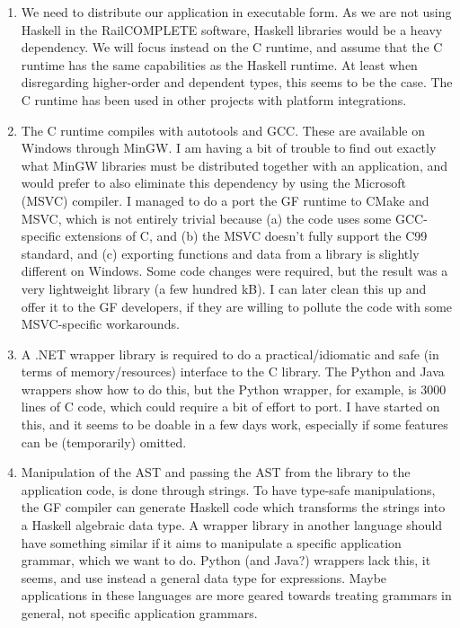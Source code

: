 \documentclass[]{article}
\begin{document}
\begin{enumerate}
\def\labelenumi{\arabic{enumi}.}
\item
  We need to distribute our application in executable form. As we are
  not using Haskell in the RailCOMPLETE software, Haskell libraries
  would be a heavy dependency. We will focus instead on the C runtime,
  and assume that the C runtime has the same capabilities as the Haskell
  runtime. At least when disregarding higher-order and dependent types,
  this seems to be the case. The C runtime has been used in other
  projects with platform integrations.
\item
  The C runtime compiles with autotools and GCC. These are available on
  Windows through MinGW. I am having a bit of trouble to find out
  exactly what MinGW libraries must be distributed together with an
  application, and would prefer to also eliminate this dependency by
  using the Microsoft (MSVC) compiler. I managed to do a port the GF
  runtime to CMake and MSVC, which is not entirely trivial because (a)
  the code uses some GCC-specific extensions of C, and (b) the MSVC
  doesn't fully support the C99 standard, and (c) exporting functions
  and data from a library is slightly different on Windows. Some code
  changes were required, but the result was a very lightweight library
  (a few hundred kB). I can later clean this up and offer it to the GF
  developers, if they are willing to pollute the code with some
  MSVC-specific workarounds.
\item
  A .NET wrapper library is required to do a practical/idiomatic and
  safe (in terms of memory/resources) interface to the C library. The
  Python and Java wrappers show how to do this, but the Python wrapper,
  for example, is 3000 lines of C code, which could require a bit of
  effort to port. I have started on this, and it seems to be doable in a
  few days work, especially if some features can be (temporarily)
  omitted.
\item
  Manipulation of the AST and passing the AST from the library to the
  application code, is done through strings. To have type-safe
  manipulations, the GF compiler can generate Haskell code which
  transforms the strings into a Haskell algebraic data type. A wrapper
  library in another language should have something similar if it aims
  to manipulate a specific application grammar, which we want to do.
  Python (and Java?) wrappers lack this, it seems, and use instead a
  general data type for expressions. Maybe applications in these
  languages are more geared towards treating grammars in general, not
  specific application grammars.
\end{enumerate}
\end{document}
